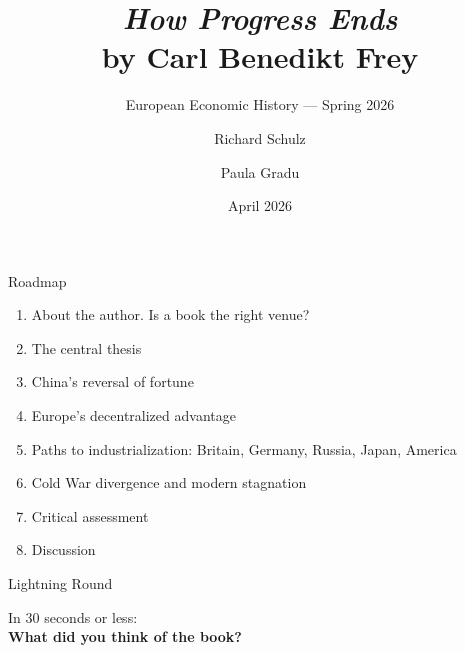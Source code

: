 \documentclass[aspectratio=169, 11pt]{beamer}
\title{\textit{How Progress Ends} \\ by Carl Benedikt Frey}
\subtitle{European Economic History --- Spring 2026}
\author{Richard Schulz \and Paula Gradu}
\institute{University of California, Berkeley \\ with Barry Eichengreen}
\date{April 2026}
\begin{document}

\begin{frame}[plain]
    \titlepage
\end{frame}


\begin{frame}{Roadmap}
    \begin{enumerate}
        \item About the author. Is a book the right venue?
        \item The central thesis
        \item China's reversal of fortune
        \item Europe's decentralized advantage
        \item Paths to industrialization: Britain, Germany, Russia, Japan, America
        \item Cold War divergence and modern stagnation
        \item Critical assessment
        \item Discussion
    \end{enumerate}
\end{frame}

\begin{frame}{Lightning Round}
    \begin{center}
        \Large
        In 30 seconds or less: \\[1em]
        \textbf{What did you think of the book?}
    \end{center}
\end{frame}

\end{document}
